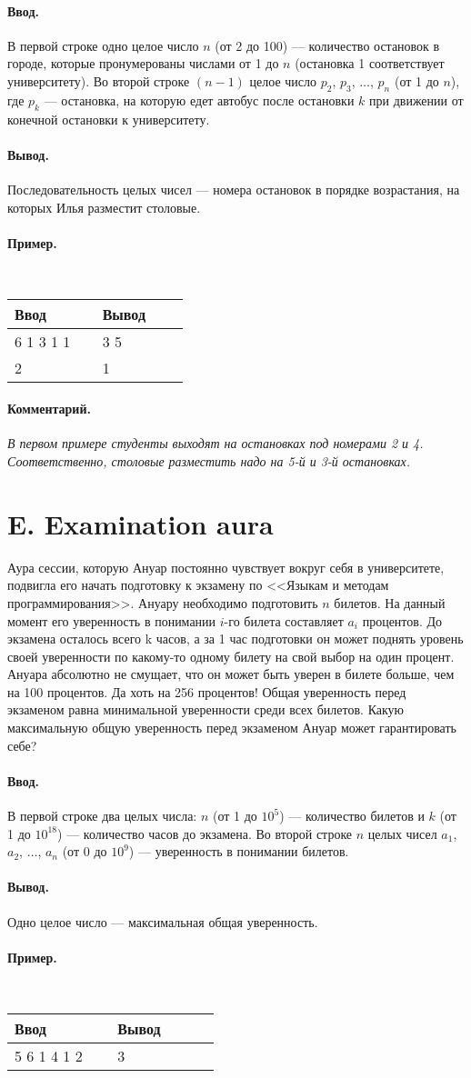 \documentclass[10pt, a5paper]{article}
\newcommand{\informat}[1]
{
	\paragraph{Ввод.\\} #1
}
\newcommand{\outformat}[1]
{
	\paragraph{Вывод.\\} #1
}
\newcommand{\example}[2]
{
	\paragraph{Пример.\\}
	{\tt
	\begin{tabular}{|p{0.4\linewidth}|p{0.4\linewidth}|}
	\hline
	Ввод & Вывод \\
	\hline
	#1 & #2		\\
	\hline
	\end{tabular}
	}
}
\newcommand{\examplee}[4]
{
	\paragraph{Пример.\\}
	{\tt
	\begin{tabular}{|p{0.4\linewidth}|p{0.4\linewidth}|}
	\hline
	Ввод 	& Вывод  	\\
	\hline
	#1 		& #2 		\\
	\hline
	#3		& #4		\\
	\hline
	\end{tabular}
	}
}
\newcommand{\excomm}[1]
{
	\paragraph{Комментарий. \\}
	\textit{#1}
}
\begin{document}
\informat{В первой строке одно целое число $n$ (от 2 до 100) --- количество остановок в городе, которые пронумерованы числами от 1 до $n$ (остановка 1 соответствует университету). Во второй строке $(n-1)$ целое число $p_2$, $p_3$, $\dots$, $p_n$ (от 1 до $n$), где $p_k$ --- остановка, на которую едет автобус после остановки $k$ при движении от конечной остановки к университету.}
 
\outformat{Последовательность целых чисел --- номера остановок в порядке возрастания, на которых Илья разместит столовые.}

\examplee{6 \newline 5 1 3 1 1}{3 5}{2 \newline 1}{1}

\excomm{В первом примере студенты выходят на остановках под номерами 2 и 4. Соответственно, столовые разместить надо на 5-й и 3-й остановках.}



\section*{E. Examination aura}

Аура сессии, которую Ануар постоянно чувствует вокруг себя в университете, подвигла его начать подготовку к экзамену по <<Языкам и методам программирования>>. Ануару необходимо подготовить $n$ билетов. На данный момент его уверенность в понимании $i$-го билета составляет $a_i$ процентов. До экзамена осталось всего k часов, а за 1 час подготовки он может поднять уровень своей уверенности по какому-то одному билету на свой выбор на один процент. Ануара абсолютно не смущает, что он может быть уверен в билете больше, чем на 100 процентов. Да хоть на 256 процентов! Общая уверенность перед экзаменом равна минимальной уверенности среди всех билетов. Какую максимальную общую уверенность перед экзаменом Ануар может гарантировать себе? 
 
\informat{В первой строке два целых числа: $n$ (от 1 до $10^5$) --- количество билетов и $k$ (от 1 до $10^{18}$) --- количество часов до экзамена. \newline
Во второй строке $n$ целых чисел $a_1$, $a_2$, $\dots$, $a_n$ (от 0 до $10^9$) --- уверенность в понимании билетов.}

\outformat{Одно целое число --- максимальная общая уверенность.}
 
\example{5 6 \newline 5 1 4 1 2}{3}
 
\end{document}
